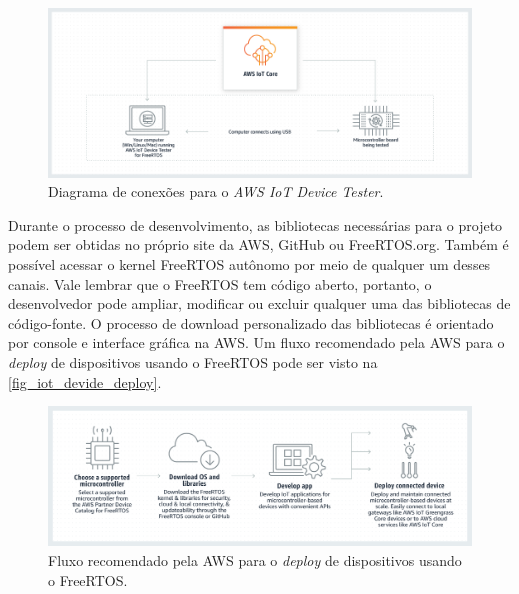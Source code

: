 \begin{figure}[htb]
	\caption{Diagrama de conexões para o \textit{AWS IoT Device Tester}.}
	\begin{center}
		\includegraphics[scale=0.4]{Imagens/aws_iot_device_tester.png}
	\end{center}
	\label{fig_aws_iot_device_tester}
\end{figure}

Durante o processo de desenvolvimento, as bibliotecas necessárias para o projeto podem ser obtidas no próprio site da AWS, GitHub ou FreeRTOS.org. Também é possível acessar o kernel FreeRTOS autônomo por meio de qualquer um desses canais. Vale lembrar que o FreeRTOS tem código aberto, portanto, o desenvolvedor pode ampliar, modificar ou excluir qualquer uma das bibliotecas de código-fonte. O processo de download personalizado das bibliotecas é orientado por console e interface gráfica na AWS. Um fluxo recomendado pela AWS para o \textit{deploy} de dispositivos usando o FreeRTOS pode ser visto na \autoref{fig_iot_devide_deploy}.
\begin{figure}[htb]
	\caption{Fluxo recomendado pela AWS para o \textit{deploy} de dispositivos usando o FreeRTOS.}
	\begin{center}
		\includegraphics[scale=0.4]{Imagens/iot_device_deploy.png}
	\end{center}
	\label{fig_iot_devide_deploy}
\end{figure}

